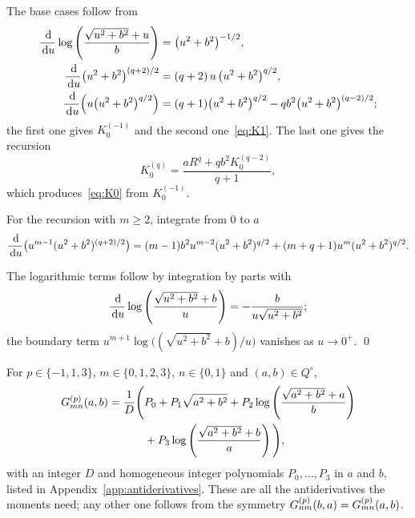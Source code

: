 \vspace{\baselineskip}
\proof
The base cases follow from
\begin{equation}
    \begin{aligned}
    \frac{\,\mathrm{d}}{\,\mathrm{d} u}\log\left(\frac{\sqrt{u^2+b^2}+u}{b}\right) &= \bigl(u^2+b^2\bigr)^{-1/2},\\
    \frac{\,\mathrm{d}}{\,\mathrm{d} u}\bigl(u^2+b^2\bigr)^{(q+2)/2} &= (q+2)\,u\,\bigl(u^2+b^2\bigr)^{q/2},\\
    \frac{\,\mathrm{d}}{\,\mathrm{d} u}\Bigl(u\bigl(u^2+b^2\bigr)^{q/2}\Bigr) &= (q+1)\bigl(u^2+b^2\bigr)^{q/2}-qb^2\bigl(u^2+b^2\bigr)^{(q-2)/2};
    \end{aligned}
\end{equation}
the first one gives $K^{(-1)}_0$ and the second one~\eqref{eq:K1}. The last one gives the recursion
\begin{equation}
    K^{(q)}_0=\frac{aR^q+qb^2K^{(q-2)}_0}{q+1},
\end{equation}
which produces~\eqref{eq:K0} from $K^{(-1)}_0$.

For the recursion with $m\ge2$, integrate from $0$ to $a$
\begin{equation}
    \frac{\,\mathrm{d}}{\,\mathrm{d} u}\bigl(u^{m-1}(u^2+b^2)^{(q+2)/2}\bigr)=(m-1)b^2u^{m-2}(u^2+b^2)^{q/2}+(m+q+1)u^m(u^2+b^2)^{q/2}.
\end{equation}

The logarithmic terms follow by integration by parts with
\begin{equation}
    \frac{\,\mathrm{d}}{\,\mathrm{d} u}\log\left(\frac{\sqrt{u^2+b^2}+b}{u}\right)=-\frac{b}{u\sqrt{u^2+b^2}};
\end{equation}
the boundary term $u^{m+1}\log\bigl((\sqrt{u^2+b^2}+b)/u\bigr)$ vanishes as $u\to0^+$. \qed

 For $p\in\{-1,1,3\}$, $m\in\{0,1,2,3\}$, $n\in\{0,1\}$ and $(a,b)\in Q^\circ$,
\begin{equation}
    \label{eq:Gform}
    \begin{split}
    \Gf{p}{m}{n}(a,b) &= \frac{1}{D}\Bigg(P_0 + P_1\sqrt{a^2+b^2} + P_2\log\left(\frac{\sqrt{a^2+b^2}+a}{b}\right)\\
    &\phantom{{}=\frac{1}{D}\Bigg(}+ P_3\log\left(\frac{\sqrt{a^2+b^2}+b}{a}\right)\Bigg),
    \end{split}
\end{equation}
with an integer $D$ and homogeneous integer polynomials $P_0,\dots,P_3$ in $a$ and $b$, listed in Appendix~\ref{app:antiderivatives}. These
are all the antiderivatives the moments need; any other one follows from the symmetry
$G^{(p)}_{nm}(b,a)=G^{(p)}_{mn}(a,b)$.

